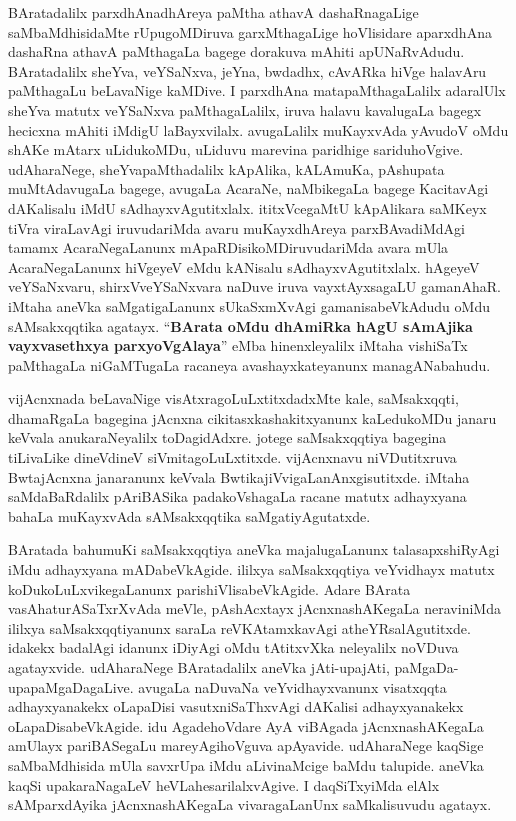 \medskip

BAratadalilx parxdhAnadhAreya paMtha athavA dashaRnagaLige saMbaMdhisidaMte rUpugoMDiruva garxMthagaLige hoVlisidare \hbox{aparxdhAna} dashaRna athavA paMthagaLa bagege dorakuva mAhiti apUNaRvAdudu. BAratadalilx sheYva, veYSaNxva, jeYna, bwdadhx, cAvARka hiVge halavAru paMthagaLu beLavaNige kaMDive. I parxdhAna matapaMthagaLalilx adaralUlx sheYva matutx veYSaNxva paMthagaLalilx, iruva halavu kavalu\-gaLa bagegx hecicxna mAhiti iMdigU laBayxvilalx. avugaLalilx muKayxvAda yAvudoV oMdu shAKe mAtarx  uLidukoMDu, uLiduvu marevina paridhige sariduhoVgive. udAharaNege, sheYvapaMthadalilx kApAlika, kALAmuKa, pAshupata muMtAdavugaLa bagege, avugaLa AcaraNe, naMbikegaLa bagege KacitavAgi dAKalisalu iMdU sAdhayxvAgutitxlalx. ititxVcegaMtU kApAlikara saMKeyx tiVra viraLa\-vAgi iruvudariMda avaru muKayxdhAreya parxBAvadiMdAgi tamamx AcaraNegaLanunx mApaRDisikoMDiruvudariMda avara mUla AcaraNegaLanunx hiVgeyeV eMdu kANisalu sAdhayxvAgutitxlalx. hAgeyeV veYSaNxvaru, shirxVveYSaNxvara naDuve iruva vayxtAyxsagaLU gamanAhaR. iMtaha aneVka saMgatigaLanunx sUkaSxmXvAgi gamanisabeVkAdudu oMdu sAMsakxqqtika agatayx. ``\textbf{BArata oMdu dhAmiRka hAgU sAmAjika vayxvasethxya parxyoVgAlaya}'' eMba hinenxleyalilx iMtaha vishiSaTx paMthagaLa niGaMTugaLa racaneya avashayxkateyanunx managANa\-bahudu. 

\medskip

vijAcnxnada beLavaNige visAtxragoLuLxtitxdadxMte kale, saMsakxqqti, dhamaRgaLa bagegina jAcnxna cikitasxkashakitxyanunx kaLedukoMDu janaru keVvala anukaraNeyalilx toDagidAdxre. jotege saMsakxqqtiya bagegina tiLivaLike dineVdineV siVmitagoLuLxtitxde. vijAcnxnavu niVDutitxruva BwtajAcnxna janaranunx keVvala BwtikajiVvigaLanAnxgisutitxde. iMtaha saMdaBaRdalilx pAriBASika padakoVshagaLa racane matutx adhayxyana bahaLa muKayxvAda sAMsakxqqtika saMgatiyAgutatxde.

\eject

BAratada bahumuKi saMsakxqqtiya aneVka majalugaLanunx talasapxshiRyAgi iMdu adhayxyana mADabeVkAgide. ililxya saMsakxqqtiya veYvidhayx matutx koDukoLuLxvikegaLanunx parishiVlisabeVkAgide. Adare BArata vasAhaturASaTxrXvAda meVle, pAshAcxtayx jAcnxnashAKegaLa nera\-viniMda ililxya saMsakxqqtiyanunx saraLa reVKAtamxkavAgi atheYRsalAgutitxde. idakekx badalAgi idanunx iDiyAgi oMdu tAtitxvXka neleyalilx noVDuva agatayxvide. udAharaNege BAratadalilx aneVka jAti-upajAti, paMgaDa-upapaMgaDagaLive. avugaLa naDuvaNa veYvidhayx\-vanunx visatxqqta adhayxyanakekx oLapaDisi vasutxniSaThxvAgi dAKalisi adhayxyanakekx oLapaDisabeVkAgide. idu AgadehoVdare AyA \hbox{viBAgada} jAcnxnashAKegaLa amUlayx pariBASegaLu mareyAgihoVguva apAyavide. udAharaNege kaqSige saMbaMdhisida mUla savxrUpa iMdu aLivinaMcige baMdu talupide. aneVka kaqSi upakaraNagaLeV heVLahesarilalx\-vAgive. I daqSiTxyiMda elAlx sAMparxdAyika jAcnxnashAKegaLa vivaragaLanUnx saMkalisuvudu agatayx. 

